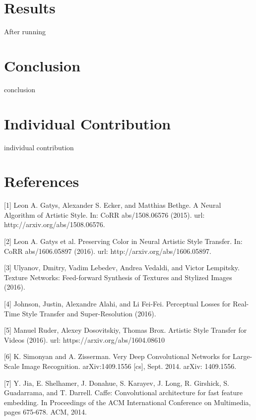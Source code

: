 \documentclass[10pt,twocolumn,letterpaper]{article}
\begin{document}
\section{Results}

After running 

\section{Conclusion}

conclusion

\section{Individual Contribution}

individual contribution

\section{References}

[1] Leon A. Gatys, Alexander S. Ecker, and Matthias Bethge. A Neural Algorithm of Artistic Style. In: CoRR abs/1508.06576 (2015). url: http://arxiv.org/abs/1508.06576.

[2] Leon A. Gatys et al. Preserving Color in Neural Artistic Style Transfer. In: CoRR abs/1606.05897 (2016). url: http://arxiv.org/abs/1606.05897.

[3] Ulyanov, Dmitry, Vadim Lebedev, Andrea Vedaldi, and Victor Lempitsky. Texture Networks: Feed-forward Synthesis of Textures and Stylized Images (2016).

[4] Johnson, Justin, Alexandre Alahi, and Li Fei-Fei. Perceptual Losses for Real-Time Style Transfer and Super-Resolution (2016).

[5] Manuel Ruder, Alexey Dosovitskiy, Thomas Brox. Artistic Style Transfer for Videos (2016). url: https://arxiv.org/abs/1604.08610

[6] K. Simonyan and A. Zisserman. Very Deep Convolutional Networks for Large-Scale Image Recognition. arXiv:1409.1556 [cs], Sept. 2014. arXiv: 1409.1556.

[7] Y. Jia, E. Shelhamer, J. Donahue, S. Karayev, J. Long, R. Girshick, S. Guadarrama, and T. Darrell. Caffe: Convolutional
architecture for fast feature embedding. In Proceedings of the ACM International Conference on Multimedia, pages 675-678. ACM, 2014.

{\small


}
\end{document}
